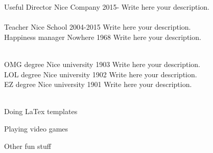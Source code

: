 \documentclass[11pt]{spidercv}
\begin{document}
    

    \DefineProfile{\ColorOther}{\ColorTextSide}{}




    \begin{MainPart}

    \Experience
        {\ColorHighlight}
		{Useful Director}
		{Nice Company}
        {2015-\faUndo}
        {   
            Write here your description.\\
            \lorem\\
            \lorem
        }
    \Experience
        {\ColorHighlight}
		{Teacher}
		{Nice School}
        {2004-2015}
        {   
            Write here your description.\\
            \lorem
        }
    \Experience
        {\ColorHighlight}
		{Happiness manager}
		{Nowhere}
        {1968}
        {   
            Write here your description.\\
            \lorem\\
            \lorem
        }


    
    \Experience
        {\ColorHighlight}
		{OMG degree}
		{Nice university}
        {1903}
        {   
            Write here your description.\\
            \lorem
        }
    \Experience
        {\ColorHighlight}
		{LOL degree}
		{Nice university}
        {1902}
        {   
            Write here your description.\\
            \lorem
        }
    \Experience
        {\ColorHighlight}
		{EZ degree}
		{Nice university}
        {1901}
        {   
            Write here your description.\\
            \lorem\\
            \lorem
        }


    \vspace*{0.5cm}
    \begin{DoubleColumns}
        \begin{ItemList}{\ColorHighlight}
            \item [] Doing LaTex templates
            \item [] Playing video games
        \end{ItemList}
        \nextcolumn
        \begin{ItemList}{\ColorHighlight}
            \item [] Other fun stuff
        \end{ItemList}
    \end{DoubleColumns}

    \end{MainPart}

    
\end{document}
